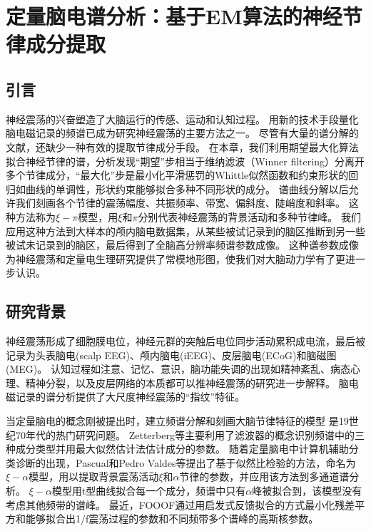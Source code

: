 \chapter{定量脑电谱分析：基于EM算法的神经节律成分提取}

\section{引言}
神经震荡的兴奋塑造了大脑运行的传感、运动和认知过程。 用新的技术手段量化脑电磁记录的频谱已成为研究神经震荡的主要方法之一。 尽管有大量的谱分解的文献，还缺少一种有效的提取节律成分手段。 在本章，我们利用期望最大化算法拟合神经节律的谱，分析发现“期望”步相当于维纳滤波（Winner filtering）分离开多个节律成分，“最大化”步是最小化平滑惩罚的Whittle似然函数和约束形状的回归如曲线的单调性，形状约束能够拟合多种不同形状的成分。 谱曲线分解以后允许我们刻画各个节律的震荡幅度、共振频率、带宽、偏斜度、陡峭度和斜率。 这种方法称为$\xi-\pi$模型，用$\xi$和$\pi$分别代表神经震荡的背景活动和多种节律峰。 我们应用这种方法到大样本的颅内脑电数据集，从某些被试记录到的脑区推断到另一些被试未记录到的脑区，最后得到了全脑高分辨率频谱参数成像。 这种谱参数成像为神经震荡和定量电生理研究提供了常模地形图，使我们对大脑动力学有了更进一步认识。

\section{研究背景}
神经震荡形成了细胞膜电位，神经元群的突触后电位同步活动累积成电流，最后被记录为头表脑电(scalp EEG)、颅内脑电(iEEG)、皮层脑电(ECoG)和脑磁图(MEG)。 认知过程如注意、记忆、意识，脑功能失调的出现如精神紊乱、病态心理、精神分裂，以及皮层网络的本质都可以推神经震荡的研究进一步解释。 脑电磁记录的谱分析提供了大尺度神经震荡的“指纹”特征。

当定量脑电的概念刚被提出时，建立频谱分解和刻画大脑节律特征的模型
是19世纪70年代的热门研究问题。 Zetterberg等主要利用了滤波器的概念识别频谱中的三种成分类型并用最大似然估计法估计成分的参数。 随着定量脑电中计算机辅助分类诊断的出现，Pascual和Pedro Valdes等提出了基于似然比检验的方法，命名为$\xi-\alpha$模型，用以提取背景震荡活动$\xi$和$\alpha$节律的参数，并应用该方法到多通道谱分析。 $\xi-\alpha$模型用t型曲线拟合每一个成分，频谱中只有$\alpha$峰被拟合到，该模型没有考虑其他频带的谱峰。 最近，FOOOF通过用启发式反馈拟合的方式最小化残差平方和能够拟合出1/f震荡过程的参数和不同频带多个谱峰的高斯核参数。


